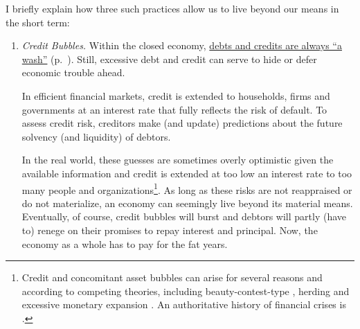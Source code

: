 I briefly explain how three such practices allow us to live beyond our means in the short term:

\begin{enumerate}
	\item {} \label{itm:credit-bubbles} \emph{Credit Bubbles.} Within the closed economy, \hyperref[itm:credits-debits-wash]{debts and credits are always ``a wash''} (p.~\pageref{itm:credits-debits-wash}). Still, excessive debt and credit can serve to hide or defer economic trouble ahead. 

	In efficient financial markets, credit is extended to households, firms and governments at an interest rate that fully reflects the risk of default. To assess credit risk, creditors make (and update) predictions about the future solvency (and liquidity) of debtors. 

	In the real world, these guesses are sometimes overly optimistic given the available information and credit is extended at too low an interest rate to too many people and organizations\footnote{
		Credit and concomitant asset bubbles can arise for several reasons and according to competing theories, including beauty-contest-type \citep{Keynes1936}, herding \citep{Banerjee-1992-aa} and excessive monetary expansion \citep{Stiglitz2010}. An authoritative history of financial crises is \cite{KindlebergerAliber-2005-aa}.}. 
	As long as these risks are not reappraised or do not materialize, an economy can seemingly live beyond its material means. Eventually, of course, credit bubbles will burst and debtors will partly (have to) renege on their promises to repay interest and principal. Now, the economy as a whole has to pay for the fat years.


\end{enumerate}
